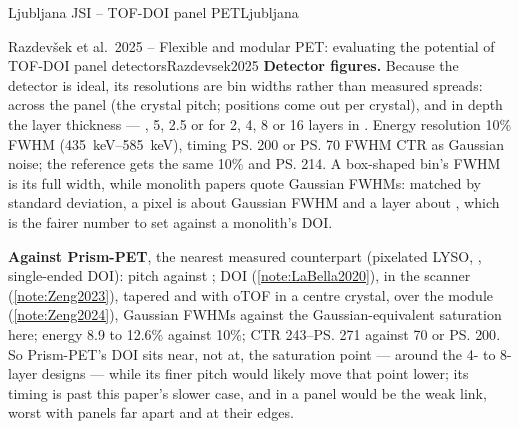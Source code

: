 \begin{programnote}{Ljubljana JSI -- TOF-DOI panel PET}{Ljubljana}
\begin{papernote}{Razdevšek et al.\ 2025 -- Flexible and modular PET: evaluating the potential of TOF-DOI panel detectors}{Razdevsek2025}
\textbf{Detector figures.} Because the detector is ideal, its resolutions are
bin widths rather than measured spreads:  across the panel (the crystal
pitch; positions come out per crystal), and in depth the layer thickness ---
, 5, 2.5 or  for 2, 4, 8 or 16 layers in . Energy
resolution 10\% FWHM (\qtyrange{435}{585}{\kilo\electronvolt}), timing
\ps{200} or \ps{70} FWHM CTR as Gaussian noise; the reference gets the same
10\% and \ps{214}. A box-shaped bin's FWHM is its full width, while monolith
papers quote Gaussian FWHMs: matched by standard deviation, a  pixel is
about  Gaussian FWHM and a  layer about , which is
the fairer number to set against a monolith's DOI.

\textbf{Against Prism-PET}, the nearest measured counterpart (pixelated LYSO,
, single-ended DOI):  pitch against ; DOI 
(\ref{note:LaBella2020}),  in the scanner (\ref{note:Zeng2023}),
 tapered and  with oTOF in a centre crystal,  over the
module (\ref{note:Zeng2024}), Gaussian
FWHMs against the  Gaussian-equivalent saturation here; energy 8.9
to 12.6\% against 10\%; CTR 243--\ps{271} against 70 or \ps{200}. So
Prism-PET's DOI sits near, not at, the saturation point --- around the 4- to
8-layer designs --- while its finer pitch would likely move that point lower;
its timing is past this paper's slower case, and in a panel would be the weak
link, worst with panels far apart and at their edges.


\end{papernote}
\end{programnote}
